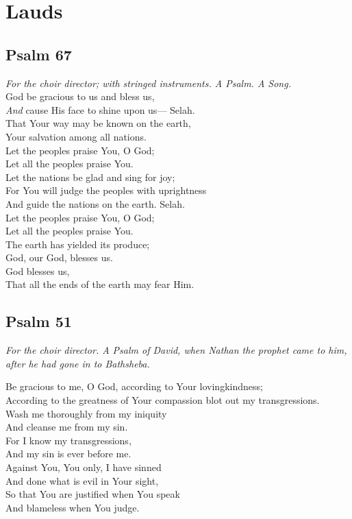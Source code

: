 \documentclass[14pt]{extbook}
\begin{document}
\newpage
\hypertarget{lauds}{%
\section{Lauds}\label{lauds}}

\hypertarget{psalm-67}{%
\subsection{Psalm 67}\label{psalm-67}}

\emph{For the choir director; with stringed instruments. A Psalm. A
Song.} \\
God be gracious to us and bless us,\\
\emph{And} cause His face to shine upon us--- Selah.\\
That Your way may be known on the earth,\\
Your salvation among all nations.\\
Let the peoples praise You, O God;\\
Let all the peoples praise You.\\
Let the nations be glad and sing for joy;\\
For You will judge the peoples with uprightness\\
And guide the nations on the earth. Selah.\\
Let the peoples praise You, O God;\\
Let all the peoples praise You.\\
The earth has yielded its produce;\\
God, our God, blesses us.\\
God blesses us,\\
That all the ends of the earth may fear Him.

\hypertarget{psalm-51}{%
\subsection{Psalm 51}\label{psalm-51}}

\emph{For the choir director. A Psalm of David, when Nathan the prophet
came to him, after he had gone in to Bathsheba.}

Be gracious to me, O God, according to Your lovingkindness;\\
According to the greatness of Your compassion blot out my
transgressions.\\
Wash me thoroughly from my iniquity\\
And cleanse me from my sin.\\
For I know my transgressions,\\
And my sin is ever before me.\\
Against You, You only, I have sinned\\
And done what is evil in Your sight,\\
So that You are justified when You speak\\
And blameless when You judge.
\end{document}
